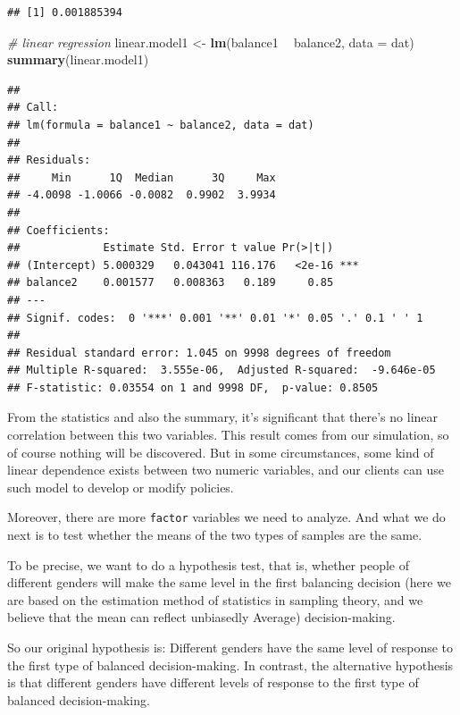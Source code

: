 \documentclass[
]{article}
\newenvironment{Shaded}{\begin{snugshade}}{\end{snugshade}}
\newcommand{\CommentTok}[1]{\textcolor[rgb]{0.56,0.35,0.01}{\textit{#1}}}
\newcommand{\DataTypeTok}[1]{\textcolor[rgb]{0.13,0.29,0.53}{#1}}
\newcommand{\KeywordTok}[1]{\textcolor[rgb]{0.13,0.29,0.53}{\textbf{#1}}}
\newcommand{\NormalTok}[1]{#1}
\newcommand{\OperatorTok}[1]{\textcolor[rgb]{0.81,0.36,0.00}{\textbf{#1}}}
\newcommand{\StringTok}[1]{\textcolor[rgb]{0.31,0.60,0.02}{#1}}
\begin{document}
\begin{verbatim}
## [1] 0.001885394
\end{verbatim}

\begin{Shaded}
\begin{Highlighting}[]
\CommentTok{# linear regression}
\NormalTok{linear.model1 <-}\StringTok{ }\KeywordTok{lm}\NormalTok{(balance1 }\OperatorTok{~}\StringTok{ }\NormalTok{balance2,}
                    \DataTypeTok{data =}\NormalTok{ dat)}
\KeywordTok{summary}\NormalTok{(linear.model1)}
\end{Highlighting}
\end{Shaded}

\begin{verbatim}
## 
## Call:
## lm(formula = balance1 ~ balance2, data = dat)
## 
## Residuals:
##     Min      1Q  Median      3Q     Max 
## -4.0098 -1.0066 -0.0082  0.9902  3.9934 
## 
## Coefficients:
##             Estimate Std. Error t value Pr(>|t|)    
## (Intercept) 5.000329   0.043041 116.176   <2e-16 ***
## balance2    0.001577   0.008363   0.189     0.85    
## ---
## Signif. codes:  0 '***' 0.001 '**' 0.01 '*' 0.05 '.' 0.1 ' ' 1
## 
## Residual standard error: 1.045 on 9998 degrees of freedom
## Multiple R-squared:  3.555e-06,  Adjusted R-squared:  -9.646e-05 
## F-statistic: 0.03554 on 1 and 9998 DF,  p-value: 0.8505
\end{verbatim}

From the statistics and also the summary, it's significant that there's
no linear correlation between this two variables. This result comes from
our simulation, so of course nothing will be discovered. But in some
circumstances, some kind of linear dependence exists between two numeric
variables, and our clients can use such model to develop or modify
policies.

Moreover, there are more \texttt{factor} variables we need to analyze.
And what we do next is to test whether the means of the two types of
samples are the same.

To be precise, we want to do a hypothesis test, that is, whether people
of different genders will make the same level in the first balancing
decision (here we are based on the estimation method of statistics in
sampling theory, and we believe that the mean can reflect unbiasedly
Average) decision-making.

So our original hypothesis is: Different genders have the same level of
response to the first type of balanced decision-making. In contrast, the
alternative hypothesis is that different genders have different levels
of response to the first type of balanced decision-making.
\end{document}
